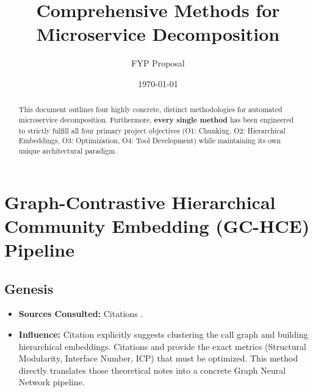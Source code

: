 \documentclass[12pt, a4paper]{article}
\title{Comprehensive Methods for Microservice Decomposition}
\author{FYP Proposal}
\date{\today}
\begin{document}
\maketitle

\begin{abstract}
This document outlines four highly concrete, distinct methodologies for automated microservice decomposition. Furthermore, \textbf{every single method} has been engineered to strictly fulfill all four primary project objectives (O1: Chunking, O2: Hierarchical Embeddings, O3: Optimization, O4: Tool Development) while maintaining its own unique architectural paradigm.
\end{abstract}

\clearpage
\section{Graph-Contrastive Hierarchical Community Embedding (GC-HCE) Pipeline}

\subsection{Genesis}
\begin{itemize}
    \item \textbf{Sources Consulted:} Citations \cite{jin2021, chaieb2024, bolanowski2022, kalia2020, kalia2021}.
    \item \textbf{Influence:} Citation \cite{jin2021} explicitly suggests clustering the call graph and building hierarchical embeddings. Citations \cite{chaieb2024} and \cite{bolanowski2022} provide the exact metrics (Structural Modularity, Interface Number, ICP) that must be optimized. This method directly translates those theoretical notes into a concrete Graph Neural Network pipeline.
\end{itemize}
\end{document}

